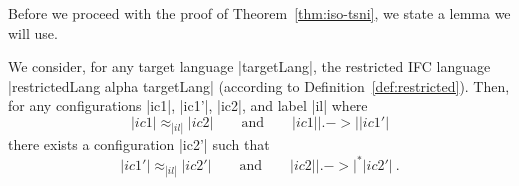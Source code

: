 Before we proceed with the proof of Theorem~\ref{thm:iso-tsni},
we state a lemma we will use.

\begin{lemma}
  \label{lemma:rr-tsni-general}
  We consider, for any target language |targetLang|,
  the restricted IFC language |restrictedLang alpha targetLang|
  (according to Definition~\ref{def:restricted}).
  Then,
  for any configurations |ic1|, |ic1'|, |ic2|, and label |il| where
  \begin{equation} \label{eq:tsni-lemma-lhs}
  |ic1| \approx_{|il|} |ic2|
  \qquad \text{and} \qquad
  |ic1| |.->| |ic1'|
  \end{equation}
  there exists a configuration |ic2'| such that
  \begin{equation} \label{eq:tsni-lemma-rhs}
  |ic1'| \approx_{|il|} |ic2'|
  \qquad \text{and} \qquad
  |ic2| |.->|^* |ic2'|
  \ \text{.}
  \end{equation}
\end{lemma}

